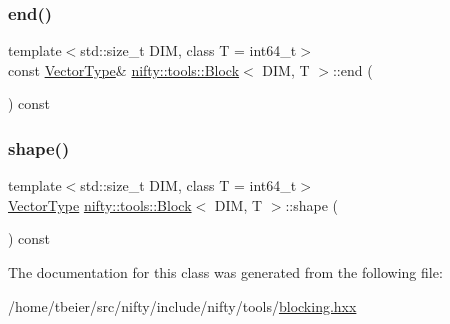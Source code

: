 \subsubsection{\texorpdfstring{end()}{end()}}
{\footnotesize\ttfamily template$<$std\+::size\+\_\+t D\+IM, class T  = int64\+\_\+t$>$ \\
const \hyperlink{classnifty_1_1tools_1_1Block_aa077b4ebbf3e4e9b679d1957ca10ba32}{Vector\+Type}\& \hyperlink{classnifty_1_1tools_1_1Block}{nifty\+::tools\+::\+Block}$<$ D\+IM, T $>$\+::end (\begin{DoxyParamCaption}{ }\end{DoxyParamCaption}) const\hspace{0.3cm}{\ttfamily [inline]}}

\mbox{\label{classnifty_1_1tools_1_1Block_ac4b21e3bd06fbdb886dc7ad30ed31000}} 
\subsubsection{\texorpdfstring{shape()}{shape()}}
{\footnotesize\ttfamily template$<$std\+::size\+\_\+t D\+IM, class T  = int64\+\_\+t$>$ \\
\hyperlink{classnifty_1_1tools_1_1Block_aa077b4ebbf3e4e9b679d1957ca10ba32}{Vector\+Type} \hyperlink{classnifty_1_1tools_1_1Block}{nifty\+::tools\+::\+Block}$<$ D\+IM, T $>$\+::shape (\begin{DoxyParamCaption}{ }\end{DoxyParamCaption}) const\hspace{0.3cm}{\ttfamily [inline]}}



The documentation for this class was generated from the following file\+:\begin{DoxyCompactItemize}
\item 
/home/tbeier/src/nifty/include/nifty/tools/\hyperlink{blocking_8hxx}{blocking.\+hxx}\end{DoxyCompactItemize}
